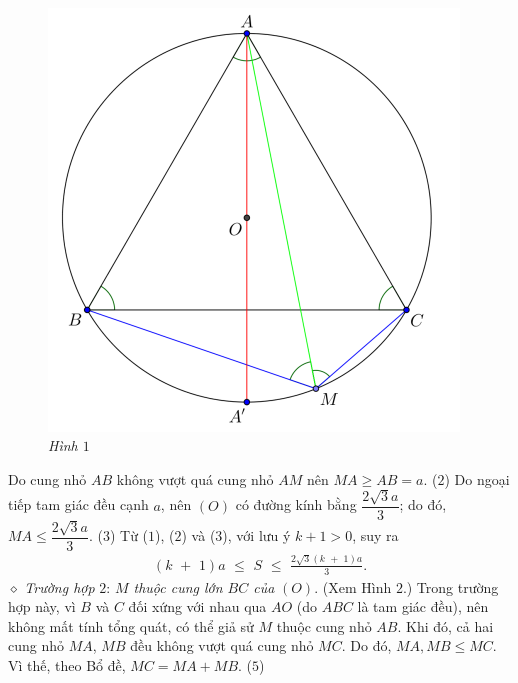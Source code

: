 \begin{multicols}{2}
\begin{align*}
	\end{align*}
	\begin{figure}[H]
		\vspace*{-5pt}
		\centering
		\captionsetup{labelformat= empty, justification=centering}
		\includegraphics[width= 1\linewidth]{P665H1}
		\caption{\small\textit{\color{thachthuctoanhoc}Hình $1$}}
		\vspace*{-10pt}
	\end{figure}
	Do cung nhỏ $AB$ không vượt quá cung nhỏ $AM$ nên $MA \ge AB = a$. \hfill ($2$)
	\vskip 0.05cm
	Do ngoại tiếp tam giác đều cạnh $a$, nên $(O)$ có đường kính bằng $\dfrac{2\sqrt{3}a}{3}$; do đó,  $MA \le \dfrac{2\sqrt{3}a}{3}$.             \hfill ($3$)
	\vskip 0.05cm
	Từ ($1$), ($2$) và ($3$), với lưu ý $k + 1 > 0$, suy ra
	\begin{align*}
		\left( {k\,\, + \,\,1} \right)a\,\, \le \,\,S\,\, \le \,\,\frac{{2\sqrt 3 \left( {k\,\, + \,\,1} \right)a}}{3}. \tag{$4$}
	\end{align*}
	$\diamond$ \textit{Trường hợp} $2$: \textit{$M$ thuộc cung lớn $BC$ của} $(O)$. (Xem Hình $2$.)
	\vskip 0.05cm
	Trong trường hợp này, vì $B$ và $C$ đối xứng với nhau qua $AO$ (do $ABC$ là tam giác đều), nên không mất tính tổng quát, có thể giả sử $M$ thuộc cung nhỏ $AB$.
	\vskip 0.05cm
	Khi đó, cả hai cung nhỏ $MA$, $MB$ đều không vượt quá cung nhỏ $MC$. Do đó, $MA, MB \le MC$. Vì thế, theo Bổ đề, $MC = MA + MB.$ \hfill ($5$)

\end{multicols}
